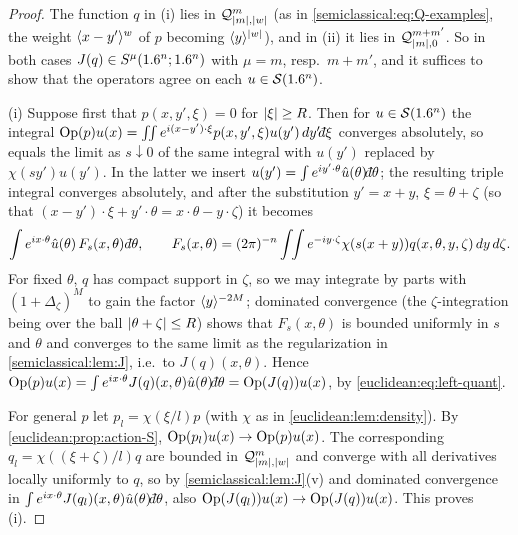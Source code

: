 \begin{proof}
  The function $q$ in (i) lies in $\mathcal{Q}^{m}_{\lvert m\rvert,\lvert w\rvert}$ (as in
  \eqref{semiclassical:eq:Q-examples}, the weight $\langle x-y'\rangle^w$ of $p$ becoming
  $\langle y\rangle^{\lvert w\rvert}$), and in (ii) it lies in $\mathcal{Q}^{m+m'}_{\lvert m\rvert,0}$. So in both
  cases $J(q)\in S^\mu(1.6^n;1.6^n)$ with $\mu=m$, resp.\ $m+m'$, and it suffices to
  show that the operators agree on each $u\in\mathcal{S}(1.6^n)$.

  (i) Suppose first that $p(x,y',\xi)=0$ for $\lvert \xi\rvert\ge R$. Then for
  $u\in\mathcal{S}(1.6^n)$ the integral $\Op(p)u(x)=\int\!\!\int e^{i(x-y')\cdot\xi}p(x,y',\xi)u(y')\,dy'\dbar\xi$
  converges absolutely, so equals the limit as $s\downarrow0$ of the same integral
  with $u(y')$ replaced by $\chi(sy')u(y')$. In the latter we insert
  $u(y')=\int e^{iy'\cdot\theta}\hat u(\theta)\dbar\theta$; the resulting triple
  integral converges absolutely, and after the substitution $y'=x+y$,
  $\xi=\theta+\zeta$ (so that $(x-y')\cdot\xi+y'\cdot\theta=x\cdot\theta-y\cdot\zeta$) it
  becomes
  \begin{equation*}
    \int e^{ix\cdot\theta}\hat u(\theta)\,F_s(x,\theta)\,\dbar\theta,\qquad
    F_s(x,\theta)=(2\pi)^{-n}\int\!\!\int e^{-iy\cdot\zeta}\chi(s(x+y))q(x,\theta,y,\zeta)\,dy\,d\zeta .
  \end{equation*}
  For fixed $\theta$, $q$ has compact support in $\zeta$, so we may integrate by
  parts with $(1+\Delta_\zeta)^M$ to gain the factor $\langle y\rangle^{-2M}$; dominated
  convergence (the $\zeta$-integration being over the ball $\lvert \theta+\zeta\rvert\le R$)
  shows that $F_s(x,\theta)$ is bounded uniformly in $s$ and $\theta$ and converges
  to the same limit as the regularization in \cref{semiclassical:lem:J}, i.e.\
  to $J(q)(x,\theta)$. Hence $\Op(p)u(x)=\int e^{ix\cdot\theta}J(q)(x,\theta)\hat u(\theta)\dbar\theta
  =\Op(J(q))u(x)$, by \eqref{euclidean:eq:left-quant}.

  For general $p$ let $p_l=\chi(\xi/l)p$ (with $\chi$ as in
  \cref{euclidean:lem:density}). By \cref{euclidean:prop:action-S},
  $\operatorname{Op}(p_l)u(x)\to\operatorname{Op}(p)u(x)$. The corresponding $q_l=\chi((\xi+\zeta)/l)q$ are
  bounded in $\mathcal{Q}^{m}_{\lvert m\rvert,\lvert w\rvert}$ and converge with all derivatives locally
  uniformly to $q$, so by \cref{semiclassical:lem:J}(v) and dominated convergence
  in $\int e^{ix\cdot\theta}J(q_l)(x,\theta)\hat u(\theta)\dbar\theta$, also
  $\operatorname{Op}(J(q_l))u(x)\to\operatorname{Op}(J(q))u(x)$. This proves (i).


\end{proof}
